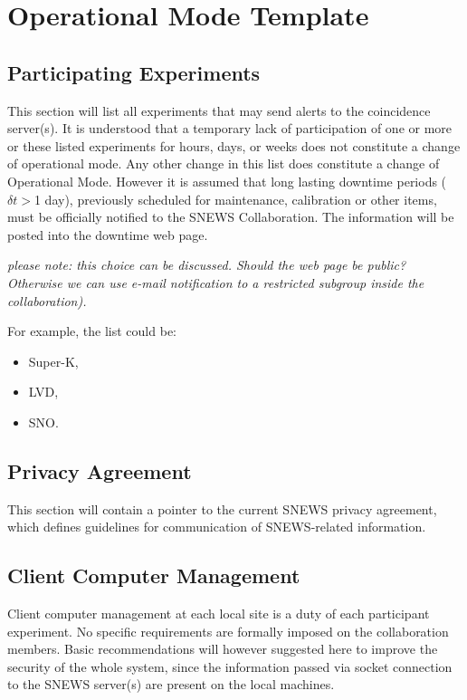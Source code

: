 \documentclass{article}
\begin{document}
\section{Operational Mode Template}

\subsection{Participating Experiments}

This section will list all experiments that may send alerts to the
coincidence server(s).  It is understood that a temporary lack of
participation of one or more or these listed experiments for hours,
days, or weeks does not constitute a change of operational mode.  Any
other change in this list does constitute a change of Operational
Mode. However it is assumed that long lasting downtime periods
($\delta t>$1 day), previously scheduled for maintenance, calibration
or other items, must be officially notified to the SNEWS
Collaboration. The information will be posted into the downtime web
page.

{\it please note: this choice can be discussed. Should the web page be public? 
Otherwise we can use e-mail notification to a restricted  subgroup inside the 
collaboration).}

 For example, the list could be:

\begin{itemize}
\item Super-K,
\item LVD,
\item SNO.
\end{itemize}

\subsection{Privacy Agreement}
This section will contain a pointer to the current SNEWS privacy
agreement, which defines guidelines for communication
of SNEWS-related information.

\subsection{Client Computer Management}

Client computer management at each local site is a duty of each
participant experiment. No specific requirements are formally imposed
on the collaboration members. Basic recommendations will however
suggested here to improve the security of the whole system, since the
information passed via socket connection to the SNEWS server(s) are
present on the local machines.
\end{document}
